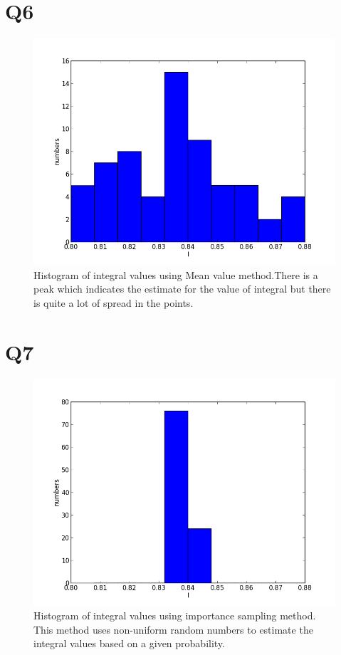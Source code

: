 \documentclass[letterpaper,12pt]{article}
\begin{document}
\section*{Q6}

\FloatBarrier
\begin{figure}[H]
\centering
\includegraphics[scale=0.55]{q6.png}
\caption{Histogram of integral values using Mean value method.There is a peak which indicates the estimate for the value of integral but there is quite a lot of spread in the points.}
\end{figure}
\FloatBarrier

\section*{Q7}

\FloatBarrier
\begin{figure}[H]
\centering
\includegraphics[scale=0.55]{q7.png}
\caption{Histogram of integral values using importance sampling method. This method uses non-uniform random numbers to estimate the integral values based on a given probability.}
\end{figure}
\FloatBarrier
\end{document}
